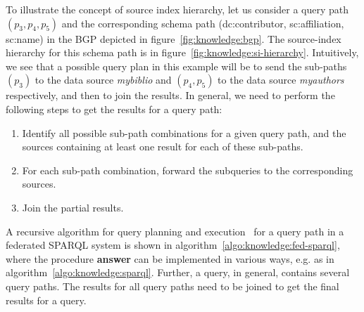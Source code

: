   
To illustrate the concept of source index hierarchy, let us consider a query path $(p_3,p_4,p_5)$ and the corresponding schema path 
(dc:contributor, sc:affiliation, sc:name) in the BGP depicted in figure~\ref{fig:knowledge:bgp}. The source-index hierarchy for this 
schema path is in figure~\ref{fig:knowledge:si-hierarchy}.  
Intuitively, we see that a possible query plan in this example will be to send the sub-paths $(p_3)$ to the data source {\it mybiblio} 
and $(p_4,p_5)$ to the data source {\it myauthors} respectively, and then to join the results. In general, we need to perform the
following steps to get the results for a query path:
\begin{enumerate}
	\item Identify all possible sub-path combinations for a given query path, and the sources containing at least one result for 
		each of these sub-paths. 
	\item For each sub-path combination, forward the subqueries to the corresponding sources.
	\item Join the partial results.
\end{enumerate}

\noindent
A recursive algorithm for query planning and execution~\citep{Stuckenschmidt:2004} for a query path in a federated SPARQL system is 
shown in algorithm~\ref{algo:knowledge:fed-sparql}, where the procedure {\bf answer} can be implemented in various ways, e.g. as in
algorithm~\ref{algo:knowledge:sparql}. Further, a query, in general, contains several query paths. The results for all query paths need
to be joined to get the final results for a query.

